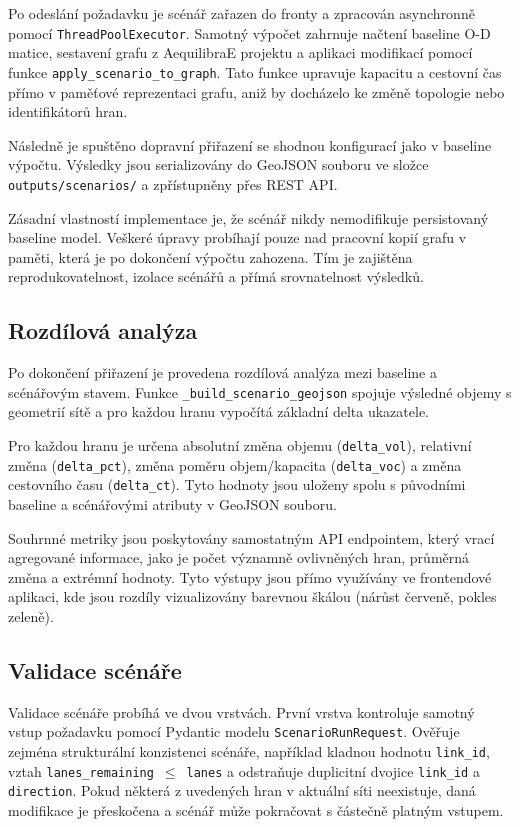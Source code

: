 Po odeslání požadavku je scénář zařazen do fronty a zpracován asynchronně pomocí \texttt{ThreadPoolExecutor}. Samotný výpočet zahrnuje načtení baseline O-D matice, sestavení grafu z AequilibraE projektu a aplikaci modifikací pomocí funkce \texttt{apply\_scenario\_to\_graph}. Tato funkce upravuje kapacitu a cestovní čas přímo v paměťové reprezentaci grafu, aniž by docházelo ke změně topologie nebo identifikátorů hran.

Následně je spuštěno dopravní přiřazení se shodnou konfigurací jako v baseline výpočtu. Výsledky jsou serializovány do GeoJSON souboru ve složce \texttt{outputs/scenarios/} a zpřístupněny přes REST API.

Zásadní vlastností implementace je, že scénář nikdy nemodifikuje persistovaný baseline model. Veškeré úpravy probíhají pouze nad pracovní kopií grafu v paměti, která je po dokončení výpočtu zahozena. Tím je zajištěna reprodukovatelnost, izolace scénářů a přímá srovnatelnost výsledků.


\subsection{Rozdílová analýza}
\label{sec:impl-scenarios-delta}

Po dokončení přiřazení je provedena rozdílová analýza mezi baseline a scénářovým stavem. Funkce \texttt{\_build\_scenario\_geojson} spojuje výsledné objemy s geometrií sítě a pro každou hranu vypočítá základní delta ukazatele.

Pro každou hranu je určena absolutní změna objemu (\texttt{delta\_vol}), relativní změna (\texttt{delta\_pct}), změna poměru objem/kapacita (\texttt{delta\_voc}) a změna cestovního času (\texttt{delta\_ct}). Tyto hodnoty jsou uloženy spolu s původními baseline a scénářovými atributy v GeoJSON souboru.

Souhrnné metriky jsou poskytovány samostatným API endpointem, který vrací agregované informace, jako je počet významně ovlivněných hran, průměrná změna a extrémní hodnoty. Tyto výstupy jsou přímo využívány ve frontendové aplikaci, kde jsou rozdíly vizualizovány barevnou škálou (nárůst červeně, pokles zeleně).

\subsection{Validace scénáře}
\label{sec:impl-scenarios-validation}

Validace scénáře probíhá ve dvou vrstvách. První vrstva kontroluje samotný vstup požadavku pomocí Pydantic modelu \texttt{ScenarioRunRequest}. Ověřuje zejména strukturální konzistenci scénáře, například kladnou hodnotu \texttt{link\_id}, vztah \texttt{lanes\_remaining}~$\leq$~\texttt{lanes} a odstraňuje duplicitní dvojice \texttt{link\_id} a \texttt{direction}. Pokud některá z uvedených hran v aktuální síti neexistuje, daná modifikace je přeskočena a scénář může pokračovat s částečně platným vstupem.

